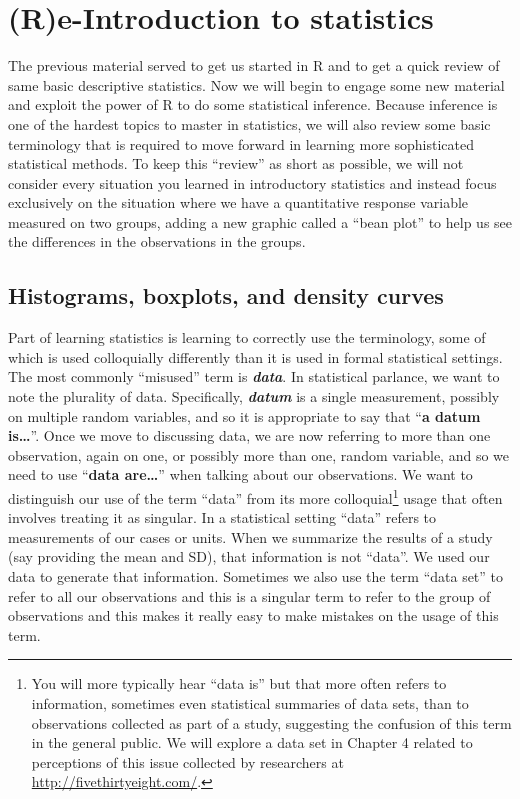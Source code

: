 \documentclass[]{book}
\let\rmarkdownfootnote\footnote%
\def\footnote{\protect\rmarkdownfootnote}
\begin{document}
\chapter{(R)e-Introduction to statistics}\label{chapter2}

The previous material served to get us started in R and to get a quick
review of same basic descriptive statistics. Now we will begin to engage
some new material and exploit the power of R to do some statistical
inference. Because inference is one of the hardest topics to master in
statistics, we will also review some basic terminology that is required
to move forward in learning more sophisticated statistical methods. To
keep this ``review'' as short as possible, we will not consider every
situation you learned in introductory statistics and instead focus
exclusively on the situation where we have a quantitative response
variable measured on two groups, adding a new graphic called a ``bean
plot'' to help us see the differences in the observations in the groups.

\section{Histograms, boxplots, and density curves}\label{section2-1}

Part of learning statistics is learning to correctly use the
terminology, some of which is used colloquially differently than it is
used in formal statistical settings. The most commonly ``misused'' term
is \textbf{\emph{data}}. In statistical parlance, we want to note the
plurality of data. Specifically, \textbf{\emph{datum}} is a single
measurement, possibly on multiple random variables, and so it is
appropriate to say that ``\textbf{a datum is\ldots{}}''. Once we move to
discussing data, we are now referring to more than one observation,
again on one, or possibly more than one, random variable, and so we need
to use ``\textbf{data are\ldots{}}'' when talking about our
observations. We want to distinguish our use of the term ``data'' from
its more colloquial\footnote{You will more typically hear ``data is''
  but that more often refers to information, sometimes even statistical
  summaries of data sets, than to observations collected as part of a
  study, suggesting the confusion of this term in the general public. We
  will explore a data set in Chapter 4 related to perceptions of this
  issue collected by researchers at \url{http://fivethirtyeight.com/}.}
usage that often involves treating it as singular. In a statistical
setting ``data'' refers to measurements of our cases or units. When we
summarize the results of a study (say providing the mean and SD), that
information is not ``data''. We used our data to generate that
information. Sometimes we also use the term ``data set'' to refer to all
our observations and this is a singular term to refer to the group of
observations and this makes it really easy to make mistakes on the usage
of this term.
\end{document}
